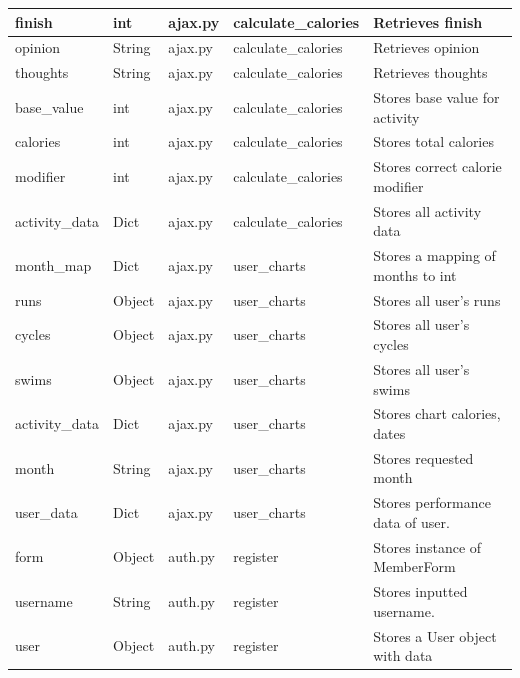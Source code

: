 \documentclass{article}[12pt,a4paper]
\begin{document}
\begin{longtable}{|l|l|l|l|l|}
finish            & int         & ajax.py        & calculate\_calories & Retrieves finish                    \\ \hline
opinion           & String      & ajax.py        & calculate\_calories & Retrieves opinion                   \\ \hline
thoughts          & String      & ajax.py        & calculate\_calories & Retrieves thoughts                  \\ \hline
base\_value       & int         & ajax.py        & calculate\_calories & Stores base value for activity      \\ \hline
calories          & int         & ajax.py        & calculate\_calories & Stores total calories               \\ \hline
modifier          & int         & ajax.py        & calculate\_calories & Stores correct calorie modifier     \\ \hline
activity\_data    & Dict        & ajax.py        & calculate\_calories & Stores all activity data            \\ \hline
month\_map        & Dict        & ajax.py        & user\_charts        & Stores a mapping of months to int       \\ \hline
runs              & Object      & ajax.py        & user\_charts        & Stores all user's runs              \\ \hline
cycles            & Object      & ajax.py        & user\_charts        & Stores all user's cycles            \\ \hline
swims             & Object      & ajax.py        & user\_charts        & Stores all user's swims             \\ \hline
activity\_data    & Dict        & ajax.py        & user\_charts        & Stores chart calories, dates    \\ \hline
month             & String      & ajax.py        & user\_charts        & Stores requested month              \\ \hline
user\_data        & Dict        & ajax.py        & user\_charts        & Stores performance data of user.    \\ \hline
form              & Object      & auth.py        & register            & Stores instance of MemberForm     \\ \hline
username          & String      & auth.py        & register            & Stores inputted username.           \\ \hline
user              & Object      & auth.py        & register            & Stores a User object with data          \\ \hline

\end{longtable}
\end{document}
